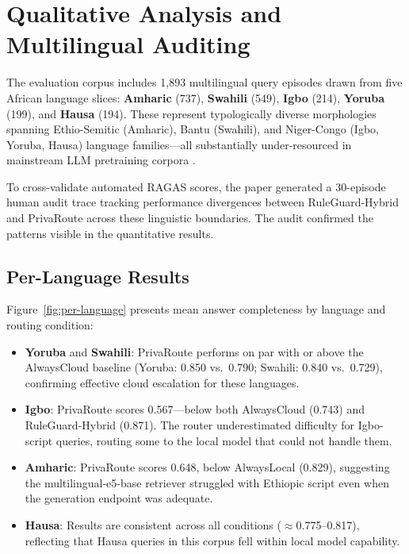 \documentclass{article}
\begin{document}
\section{Qualitative Analysis and Multilingual Auditing}

The evaluation corpus includes 1,893 multilingual query episodes drawn from five African language
slices: \textbf{Amharic} (737), \textbf{Swahili} (549), \textbf{Igbo} (214), \textbf{Yoruba} (199),
and \textbf{Hausa} (194). These represent typologically diverse morphologies spanning
Ethio-Semitic (Amharic), Bantu (Swahili), and Niger-Congo (Igbo, Yoruba, Hausa) language
families---all substantially under-resourced in mainstream LLM pretraining corpora \cite{adelani2021masakhaner}.

To cross-validate automated RAGAS scores, the paper generated a 30-episode human audit trace tracking
performance divergences between RuleGuard-Hybrid and PrivaRoute across these linguistic
boundaries. The audit confirmed the patterns visible in the quantitative results.

\subsection{Per-Language Results}
Figure~\ref{fig:per-language} presents mean answer completeness by language
and routing condition:

\begin{itemize}
  \item \textbf{Yoruba} and \textbf{Swahili}: PrivaRoute performs on par with or above the
    AlwaysCloud baseline (Yoruba: 0.850 vs.\ 0.790; Swahili: 0.840 vs.\ 0.729),
    confirming effective cloud escalation for these languages.
  \item \textbf{Igbo}: PrivaRoute scores 0.567---below both AlwaysCloud
    (0.743) and RuleGuard-Hybrid (0.871). The router underestimated
    difficulty for Igbo-script queries, routing some to the local model that could not
    handle them.
  \item \textbf{Amharic}: PrivaRoute scores 0.648, below AlwaysLocal (0.829), suggesting
    the multilingual-e5-base retriever struggled with Ethiopic script even when the
    generation endpoint was adequate.
  \item \textbf{Hausa}: Results are consistent across all conditions ($\approx$0.775--0.817),
    reflecting that Hausa queries in this corpus fell within local model capability.
\end{itemize}
\end{document}
